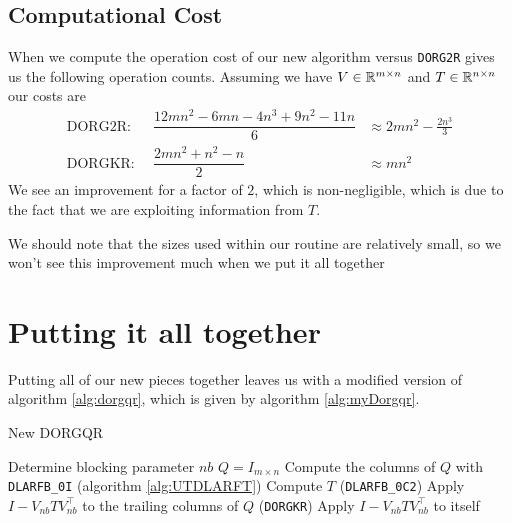 \documentclass[12pt]{article}
\begin{document}
    \subsection{Computational Cost}
    When we compute the operation cost of our new algorithm versus \verb|DORG2R| gives us the following
    operation counts.
        Assuming we have $V\in\mathbb{R}^{m\times n}$ and $T\in\mathbb{R}^{n\times n}$ our costs are 
        $$
        \begin{aligned}
            \text{DORG2R: }&\, \dfrac{12mn^2 - 6mn -4n^3 +9n^2 - 11n}{6} &\approx 2mn^2 - \frac{2n^3}{3}\\
            \text{DORGKR: }&\, \dfrac{2mn^2 + n^2 - n}{2} &\approx mn^2
        \end{aligned}
        $$
        We see an improvement for a factor of $2$, which is non-negligible, which is due to the fact that we are exploiting information from $T$.

        We should note that the sizes used within our routine are relatively small, so we won't see 
        this improvement much when we put it all together
    \section{Putting it all together}
    Putting all of our new pieces together leaves us with a modified version of algorithm \ref{alg:dorgqr}, which
    is given by algorithm \ref{alg:myDorgqr}.
    \begin{algorithm}
        \caption{New DORGQR}\label{alg:myDorgqr}
        \begin{algorithmic}[1]
            \STATE Determine blocking parameter $nb$
            \STATE $Q = I_{m\times n}$
            \STATE Compute the columns of $Q$ with \verb|DLARFB_0I|
                \STATE (algorithm \ref{alg:UTDLARFT}) Compute $T$
                \STATE (\verb|DLARFB_0C2|) Apply $I-V_{nb}TV_{nb}^\top$ to the trailing columns of $Q$
                \STATE (\verb|DORGKR|) Apply $I-V_{nb}TV_{nb}^\top$ to itself
            \ENDFOR
        \end{algorithmic}
    \end{algorithm}
\end{document}
